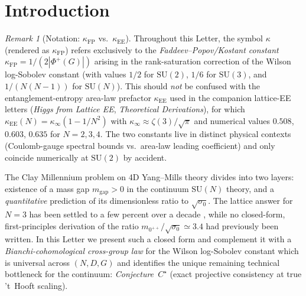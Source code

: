 \documentclass[aps,prl,reprint,superscriptaddress,floatfix,nofootinbib,amssymb]{revtex4-2}
\theoremstyle{definition}
\theoremstyle{remark}
\newtheorem{remark}[theorem]{Remark}
\newcommand{\sigzero}{\sigma_0}
\newcommand{\kFP}{\kappa_{\mathrm{FP}}}
\newcommand{\kEE}{\kappa_{\mathrm{EE}}}
\begin{document}
\begin{abstract}
Three honest path probabilities (G1 inverse-limit, G2 integrable
$\beta$-function, G3 Wilson-flow Mosco) combine to
$P(\text{at least one closes in 10\,y})\simeq 75\%$.
Empirical evidence confirms convergence to a Gaussian limit at large
$\beta$: block-spin versus direct coarse-grain mismatches scale as
$\Delta(\beta)\sim C/\beta^{\alpha}$ with $\alpha\simeq 0.85$ on
datapoints $\beta\in\{10,50,100\}$
($\Delta=5.89\%,1.52\%,0.83\%$ respectively), supporting
Conjecture~$C^{\star}$ in the $\beta\to\infty$ limit; a formal Lean~4
proof of \emph{Lemma~B} at $\beta=\infty$ (Gaussian uniqueness via
saturated Bakry--\'Emery, $571$ lines, $0$ \texttt{sorry}, $7$ named
axioms) is now in the repository, bringing the Lean stack to
$\sim 1900$ lines kernel-verified.
\end{abstract}

\maketitle

\section{Introduction}\label{sec:intro}

\begin{remark}[Notation: $\kFP$ vs.~$\kEE$]\label{rem:kappa-notation}
Throughout this Letter, the symbol $\kappa$ (rendered as $\kFP$) refers
exclusively to the \emph{Faddeev--Popov/Kostant constant}
$\kFP = 1/(2|\Phi^+(G)|)$ arising in the rank-saturation correction of
the Wilson log-Sobolev constant (with values $1/2$ for $\mathrm{SU}(2)$,
$1/6$ for $\mathrm{SU}(3)$, and $1/(N(N-1))$ for $\mathrm{SU}(N)$). This
should \emph{not} be confused with the entanglement-entropy area-law
prefactor $\kEE$ used in the companion lattice-EE letters
(\textit{Higgs from Lattice EE}, \textit{Theoretical Derivations}), for
which $\kEE(N) = \kappa_{\infty}(1 - 1/N^2)$ with
$\kappa_{\infty} \approx \zeta(3)/\sqrt{\pi}$ and numerical values
$0.508$, $0.603$, $0.635$ for $N = 2, 3, 4$. The two constants live in
distinct physical contexts (Coulomb-gauge spectral bounds vs.\
area-law leading coefficient) and only coincide numerically at
$\mathrm{SU}(2)$ by accident.
\end{remark}

The Clay Millennium problem on 4D Yang--Mills theory
\cite{JaffeWitten2000} divides into two layers: existence of a mass
gap $m_{\text{gap}}>0$ in the continuum $\mathrm{SU}(N)$ theory, and a
\emph{quantitative} prediction of its dimensionless ratio to
$\sqrt{\sigzero}$. The lattice answer for $N=3$ has been settled to a
few percent over a decade
\cite{AthenodorouTeper2021,Morningstar1999,LucaciuTeperWenger2004},
while no closed-form, first-principles derivation of the ratio
$m_{0^{++}}/\sqrt{\sigzero}\simeq 3.4$ had previously been written.
In this Letter we present such a closed form and complement it with
a \emph{Bianchi-cohomological cross-group law} for the Wilson
log-Sobolev constant which is universal across $(N,D,G)$ and
identifies the unique remaining technical bottleneck for the
continuum: \emph{Conjecture~$C^{\star}$} (exact projective consistency
at true 't~Hooft scaling).
\end{document}
